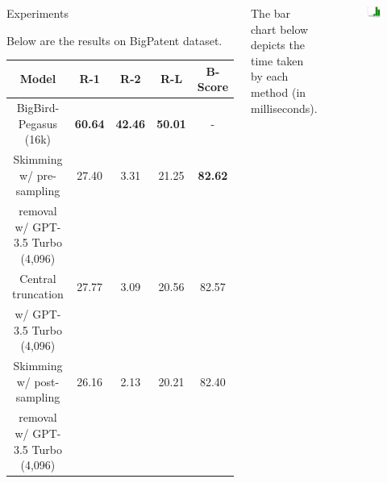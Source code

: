 \documentclass[20pt]{beamer}
\begin{document}
\begin{frame}[t]
\begin{columns}[t]
\begin{block}{Experiments}
\begin{table}[!ht]
      \label{tab:govreport}
    \end{table}

    Below are the results on BigPatent dataset.

    \begin{table}[!t]
      \centering
      \small

      \begin{tabular}{c c c c c}
        \hline
        Model & R-1 & R-2 & R-L & B-Score \\
        \hline
        BigBird-Pegasus (16k) & \textbf{60.64} & \textbf{42.46} & \textbf{50.01} & - \\
        \hline
        Skimming w/ pre-sampling & 27.40 & 3.31 & 21.25 & \textbf{82.62} \\
        removal w/ GPT-3.5 Turbo (4,096) & & & & \\
        Central truncation & 27.77 & 3.09 & 20.56 & 82.57 \\
        w/ GPT-3.5 Turbo (4,096) & & & & \\
        Skimming w/ post-sampling & 26.16 & 2.13 & 20.21 & 82.40 \\
        removal w/ GPT-3.5 Turbo (4,096) & & & & \\
        \hline
      \end{tabular}

      \label{tab:bigpatent}
    \end{table}
  \end{block}


  \vspace{.8cm}
  \begin{minipage}{\columnwidth}
    The bar chart below depicts the time taken by each method (in milliseconds).
    \begin{figure}[!h]
      \centering
      \includegraphics[width=.8\textwidth]{images/encoder-times.png}
    \end{figure}
  \end{minipage}


\end{columns}
\end{frame}
\end{document}
